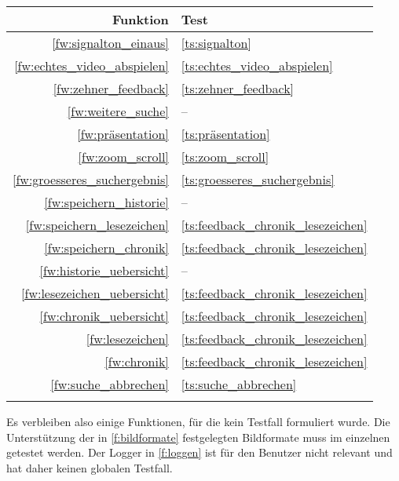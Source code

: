 \begin{minipage}[t]{0.28\textwidth}
\begin{tabular}{r | l}
Funktion & Test \\
\hline
\ref{fw:signalton_einaus} & \ref{ts:signalton} \\
\ref{fw:echtes_video_abspielen} & \ref{ts:echtes_video_abspielen} \\
\ref{fw:zehner_feedback} & \ref{ts:zehner_feedback} \\
\ref{fw:weitere_suche} & -- \\
\ref{fw:präsentation} & \ref{ts:präsentation} \\
\ref{fw:zoom_scroll} & \ref{ts:zoom_scroll} \\
\ref{fw:groesseres_suchergebnis} & \ref{ts:groesseres_suchergebnis} \\
\ref{fw:speichern_historie} & -- \\
\ref{fw:speichern_lesezeichen} & \ref{ts:feedback_chronik_lesezeichen} \\
\ref{fw:speichern_chronik} & \ref{ts:feedback_chronik_lesezeichen} \\
\ref{fw:historie_uebersicht} & -- \\
\ref{fw:lesezeichen_uebersicht} & \ref{ts:feedback_chronik_lesezeichen} \\
\ref{fw:chronik_uebersicht} & \ref{ts:feedback_chronik_lesezeichen} \\
\ref{fw:lesezeichen} & \ref{ts:feedback_chronik_lesezeichen} \\
\ref{fw:chronik} & \ref{ts:feedback_chronik_lesezeichen} \\
\ref{fw:suche_abbrechen} & \ref{ts:suche_abbrechen} \\
 &  \\
\end{tabular}
\end{minipage}\newline \newline
Es verbleiben also einige Funktionen, für die kein Testfall formuliert wurde.
Die Unterstützung der in \ref{f:bildformate} festgelegten Bildformate muss im einzelnen getestet werden.
Der Logger in \ref{f:loggen} ist für den Benutzer nicht relevant  und hat daher keinen globalen Testfall.

\pagebreak
